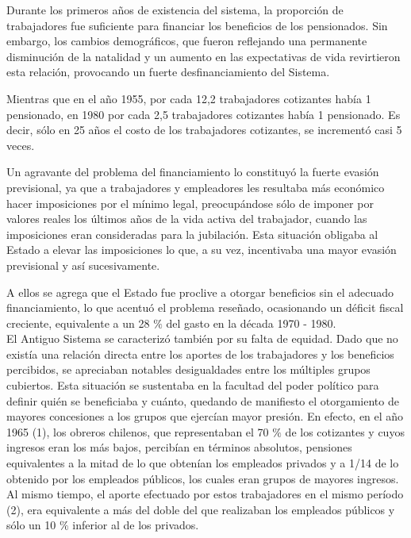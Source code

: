 Durante los primeros a\~nos de existencia del sistema, la proporci\'on de trabajadores fue suficiente para financiar los beneficios de los pensionados. Sin embargo, los cambios demogr\'aficos, que fueron reflejando una permanente disminuci\'on de la natalidad y un aumento en las expectativas de vida revirtieron esta relaci\'on, provocando un fuerte desfinanciamiento del Sistema.

Mientras que en el a\~no 1955, por cada 12,2 trabajadores cotizantes hab\'ia 1 pensionado, en 1980 por cada 2,5 trabajadores cotizantes hab\'ia 1 pensionado. Es decir, s\'olo en 25 a\~nos el costo de los trabajadores cotizantes, se increment\'o casi 5 veces.

Un agravante del problema del financiamiento lo constituy\'o la fuerte evasi\'on previsional, ya que a trabajadores y empleadores les resultaba m\'as econ\'omico hacer imposiciones por el m\'inimo legal, preocup\'andose s\'olo de imponer por valores reales los \'ultimos a\~{n}os de la vida activa del trabajador, cuando las imposiciones eran consideradas para la jubilaci\'on. Esta situaci\'on obligaba al Estado a elevar las imposiciones lo que, a su vez, incentivaba una mayor evasi\'on previsional y as\'i sucesivamente.

A ellos se agrega que el Estado fue proclive a otorgar beneficios sin el adecuado financiamiento, lo que acentu\'o el problema rese\~{n}ado, ocasionando un d\'eficit fiscal creciente, equivalente a un 28 $\%$ del gasto en la d\'ecada 1970 - 1980.\\
El Antiguo Sistema se caracteriz\'o tambi\'en por su falta de equidad. Dado que no exist\'ia una relaci\'on directa entre los aportes de los trabajadores y
los beneficios percibidos, se apreciaban notables desigualdades entre los m\'ultiples grupos cubiertos. Esta situaci\'on se sustentaba
en la facultad del poder pol\'itico para definir qui\'en se beneficiaba y cu\'anto, quedando de manifiesto el otorgamiento de mayores
concesiones a los grupos que ejerc\'ian mayor presi\'on. En efecto, en  el a\~no 1965 (1), los obreros chilenos, que representaban el 70
$\%$ de los cotizantes y cuyos ingresos eran los m\'as bajos, percib\'ian en t\'erminos absolutos, pensiones equivalentes a la mitad de lo que
obten\'ian los empleados privados y a 1/14 de lo obtenido por los empleados p\'ublicos, los cuales eran grupos de mayores ingresos. Al mismo tiempo,
el aporte efectuado por estos trabajadores en el mismo per\'iodo (2), era equivalente a m\'as del doble
del que realizaban los empleados p\'ublicos y s\'olo un 10 $\%$ inferior al de los privados.

